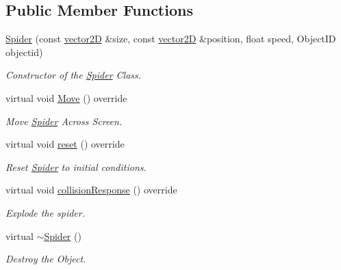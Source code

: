 \subsection*{Public Member Functions}
\begin{DoxyCompactItemize}
\item 
\mbox{\hyperlink{class_spider_afa46831c19ecd0e22b1b186cf3ff38d8}{Spider}} (const \mbox{\hyperlink{classvector2_d}{vector2D}} \&size, const \mbox{\hyperlink{classvector2_d}{vector2D}} \&position, float speed, Object\+ID objectid)
\begin{DoxyCompactList}\small\item\em Constructor of the \mbox{\hyperlink{class_spider}{Spider}} Class. \end{DoxyCompactList}\item 
\mbox{\label{class_spider_a7a5c1f3cfa2c11f1167cea5a4fff32d5}} 
virtual void \mbox{\hyperlink{class_spider_a7a5c1f3cfa2c11f1167cea5a4fff32d5}{Move}} () override
\begin{DoxyCompactList}\small\item\em Move \mbox{\hyperlink{class_spider}{Spider}} Across Screen. \end{DoxyCompactList}\item 
\mbox{\label{class_spider_a99d8b17abd435ac612ec05cfa49839ec}} 
virtual void \mbox{\hyperlink{class_spider_a99d8b17abd435ac612ec05cfa49839ec}{reset}} () override
\begin{DoxyCompactList}\small\item\em Reset \mbox{\hyperlink{class_spider}{Spider}} to initial conditions. \end{DoxyCompactList}\item 
\mbox{\label{class_spider_a5548b1fc8a2dfc3be40cf06ed13e698f}} 
virtual void \mbox{\hyperlink{class_spider_a5548b1fc8a2dfc3be40cf06ed13e698f}{collision\+Response}} () override
\begin{DoxyCompactList}\small\item\em Explode the spider. \end{DoxyCompactList}\item 
\mbox{\label{class_spider_a1f6a4d46d39696b253a924effb156971}} 
virtual \mbox{\hyperlink{class_spider_a1f6a4d46d39696b253a924effb156971}{$\sim$\+Spider}} ()
\begin{DoxyCompactList}\small\item\em Destroy the Object. \end{DoxyCompactList}\end{DoxyCompactItemize}

